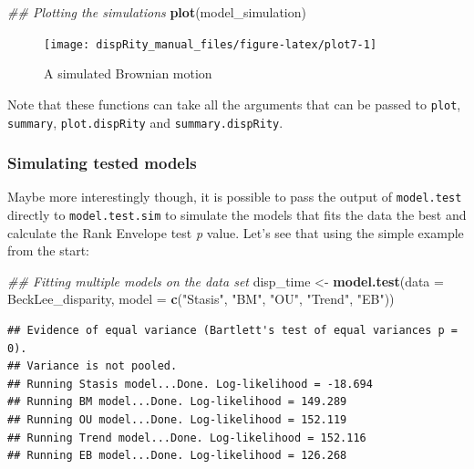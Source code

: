 \documentclass[]{book}
\newenvironment{Shaded}{\begin{snugshade}}{\end{snugshade}}
\newcommand{\CommentTok}[1]{\textcolor[rgb]{0.56,0.35,0.01}{\textit{#1}}}
\newcommand{\DataTypeTok}[1]{\textcolor[rgb]{0.13,0.29,0.53}{#1}}
\newcommand{\KeywordTok}[1]{\textcolor[rgb]{0.13,0.29,0.53}{\textbf{#1}}}
\newcommand{\NormalTok}[1]{#1}
\newcommand{\StringTok}[1]{\textcolor[rgb]{0.31,0.60,0.02}{#1}}
\begin{document}
\begin{Shaded}
\begin{Highlighting}[]
\CommentTok{## Plotting the simulations}
\KeywordTok{plot}\NormalTok{(model_simulation)}
\end{Highlighting}
\end{Shaded}

\begin{figure}

{\centering \texttt{[image: dispRity\_manual\_files/figure-latex/plot7-1]} 

}

\caption{A simulated Brownian motion}\label{fig:plot7}
\end{figure}

Note that these functions can take all the arguments that can be passed to \texttt{plot}, \texttt{summary}, \texttt{plot.dispRity} and \texttt{summary.dispRity}.

\hypertarget{simulating-tested-models}{%
\subsubsection{Simulating tested models}\label{simulating-tested-models}}

Maybe more interestingly though, it is possible to pass the output of \texttt{model.test} directly to \texttt{model.test.sim} to simulate the models that fits the data the best and calculate the Rank Envelope test \emph{p} value.
Let's see that using the simple example from the start:

\begin{Shaded}
\begin{Highlighting}[]
\CommentTok{## Fitting multiple models on the data set}
\NormalTok{disp_time <-}\StringTok{ }\KeywordTok{model.test}\NormalTok{(}\DataTypeTok{data =}\NormalTok{ BeckLee_disparity,}
                    \DataTypeTok{model =} \KeywordTok{c}\NormalTok{(}\StringTok{"Stasis"}\NormalTok{, }\StringTok{"BM"}\NormalTok{, }\StringTok{"OU"}\NormalTok{, }\StringTok{"Trend"}\NormalTok{, }\StringTok{"EB"}\NormalTok{))}
\end{Highlighting}
\end{Shaded}

\begin{verbatim}
## Evidence of equal variance (Bartlett's test of equal variances p = 0).
## Variance is not pooled.
## Running Stasis model...Done. Log-likelihood = -18.694
## Running BM model...Done. Log-likelihood = 149.289
## Running OU model...Done. Log-likelihood = 152.119
## Running Trend model...Done. Log-likelihood = 152.116
## Running EB model...Done. Log-likelihood = 126.268
\end{verbatim}
\end{document}
